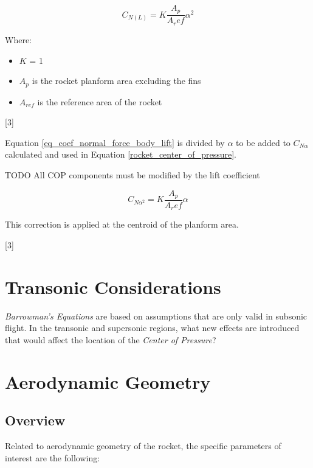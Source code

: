 \documentclass[]{book}
\providecommand{\tightlist}{%
  \setlength{\itemsep}{0pt}\setlength{\parskip}{0pt}}
\begin{document}
\begin{equation}
\label{eq_coef_normal_force_body_lift}
C_{N(L)} = K \dfrac{A_p}{A_ref} \alpha^2
\end{equation}

Where:

\begin{itemize}
\tightlist
\item
  \(K\) = 1
\item
  \(A_p\) is the rocket planform area excluding the fins
\item
  \(A_{ref}\) is the reference area of the rocket
\end{itemize}

{[}3{]}

Equation \ref{eq_coef_normal_force_body_lift} is divided by \(\alpha\)
to be added to \(C_{N \alpha}\) calculated and used in Equation
\ref{rocket_center_of_pressure}.

TODO All COP components must be modified by the lift coefficient

\begin{equation}
\label{eq_coef_normal_force_body_lift_alpha}
C_{N \alpha^2} = K \dfrac{A_p}{A_ref} \alpha
\end{equation}

This correction is applied at the centroid of the planform area.

{[}3{]}

\section{Transonic Considerations}\label{transonic-considerations}

\emph{Barrowman's Equations} are based on assumptions that are only
valid in subsonic flight. In the transonic and supersonic regions, what
new effects are introduced that would affect the location of the
\emph{Center of Pressure}?

\section{Aerodynamic Geometry}\label{aerodynamic-geometry}

\subsection{Overview}\label{overview-1}

Related to aerodynamic geometry of the rocket, the specific parameters
of interest are the following:
\end{document}
